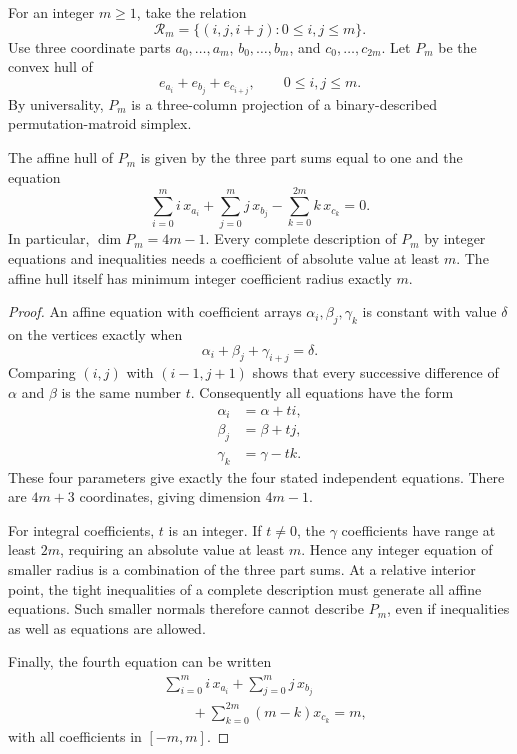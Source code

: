 For an integer $m\geq1$, take the relation
\[
 \mathcal R_m=\{(i,j,i+j):0\leq i,j\leq m\}.
\]
Use three coordinate parts $a_0,\dotsc,a_m$,
$b_0,\dotsc,b_m$, and $c_0,\dotsc,c_{2m}$. Let $P_m$ be the
convex hull of
\[
 e_{a_i}+e_{b_j}+e_{c_{i+j}},\qquad0\leq i,j\leq m.
\]
By universality, $P_m$ is a three-column projection of a
binary-described permutation-matroid simplex.

\begin{theorem}
The affine hull of $P_m$ is given by the three part sums equal to one
and the equation
\[
 \sum_{i=0}^m i\,x_{a_i}
 +\sum_{j=0}^m j\,x_{b_j}
 -\sum_{k=0}^{2m}k\,x_{c_k}=0.
\]
In particular, $\dim P_m=4m-1$. Every complete description of $P_m$
by integer equations and inequalities needs a coefficient of absolute
value at least $m$. The affine hull itself has minimum integer
coefficient radius exactly $m$.
\end{theorem}

\begin{proof}
An affine equation with coefficient arrays $\alpha_i,\beta_j,\gamma_k$
is constant with value $\delta$ on the vertices exactly when
\[
 \alpha_i+\beta_j+\gamma_{i+j}=\delta.
\]
Comparing $(i,j)$ with $(i-1,j+1)$ shows that every successive
difference of $\alpha$ and $\beta$ is the same number $t$.
Consequently all equations have the form
\[
 \begin{aligned}
 \alpha_i&=\alpha+ti,\\
 \beta_j&=\beta+tj,\\
 \gamma_k&=\gamma-tk.
 \end{aligned}
\]
These four parameters give exactly the four stated independent equations.
There are $4m+3$ coordinates, giving dimension $4m-1$.

For integral coefficients, $t$ is an integer. If $t\ne0$, the
$\gamma$ coefficients have range at least $2m$, requiring an absolute
value at least $m$. Hence any integer equation of smaller radius
is a combination of the three part sums. At a relative interior
point, the tight inequalities of a complete description must generate
all affine equations. Such smaller normals therefore cannot describe
$P_m$, even if inequalities as well as equations are allowed.

Finally, the fourth equation can be written
\[
 \begin{aligned}
 &\sum_{i=0}^m i\,x_{a_i}+\sum_{j=0}^m j\,x_{b_j}\\
 &\qquad+\sum_{k=0}^{2m}(m-k)x_{c_k}=m,
 \end{aligned}
\]
with all coefficients in $[-m,m]$.
\end{proof}

